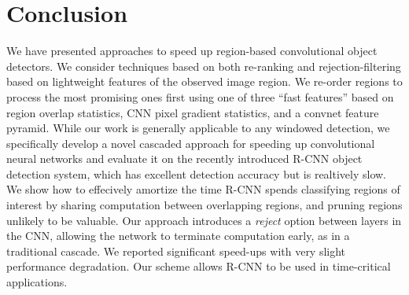 \section{Conclusion}\label{sec:conclusion}

We have presented approaches to speed up region-based convolutional
object detectors.
We consider techniques based on both re-ranking and
rejection-filtering based on lightweight features of the observed
image region.  We re-order regions to process the most promising ones
first using one of three ``fast features'' based on region overlap
statistics, CNN pixel gradient statistics, and a convnet feature
pyramid.  While our work is generally applicable to any windowed
detection, we specifically develop a novel cascaded approach for
speeding up convolutional neural networks and evaluate it on the
recently introduced R-CNN object detection system, which has excellent
detection accuracy but is realtively slow. We show how to effecively
amortize the time R-CNN spends classifying regions of interest by
sharing computation between overlapping regions, and pruning regions
unlikely to be valuable.  Our approach introduces a \emph{reject}
option between layers in the CNN, allowing the network to terminate
computation early, as in a traditional cascade.  We reported
significant speed-ups with very slight performance degradation.
Our scheme allows R-CNN to be used in time-critical
applications.

